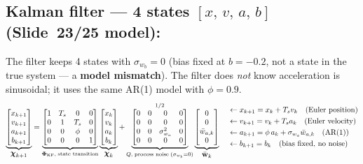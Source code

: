 \documentclass[12pt, a4paper]{article}
\begin{document}
\subsection*{Kalman filter --- 4 states $[x,\,v,\,a,\,b]$ (Slide~23/25 model):}
\vspace{-0.2cm}
The filter keeps 4 states with $\sigma_{w_b} = 0$ (bias fixed at $b = -0.2$, not a state in the true system --- a \textbf{model mismatch}).
The filter does \emph{not} know acceleration is sinusoidal; it uses the same AR(1) model with $\phi = 0.9$.
\vspace{-0.2cm}
\[
\underbrace{
\begin{bmatrix} x_{k+1} \\ v_{k+1} \\ a_{k+1} \\ b_{k+1} \end{bmatrix}
}_{\displaystyle\boldsymbol{\chi}_{k+1}}
=
\underbrace{
\begin{bmatrix}
  1 & T_s & 0    & 0 \\
  0 & 1   & T_s  & 0 \\
  0 & 0   & \phi & 0 \\
  0 & 0   & 0    & 1
\end{bmatrix}
}_{\boldsymbol{\Phi}_{\text{KF}},\;{\scriptsize\text{state transition}}}
\underbrace{
\begin{bmatrix} x_k \\ v_k \\ a_k \\ b_k \end{bmatrix}
}_{\displaystyle\boldsymbol{\chi}_k}
+
\underbrace{
\begin{bmatrix}
  0 & 0 & 0              & 0 \\
  0 & 0 & 0              & 0 \\
  0 & 0 & \sigma_{w_a}^2 & 0 \\
  0 & 0 & 0              & 0
\end{bmatrix}
}_{Q,\;{\scriptsize\text{process noise}}\;(\sigma_{w_b}=0)}^{1/2}
\underbrace{
\begin{bmatrix} 0 \\ 0 \\ \bar{w}_{a,k} \\ 0 \end{bmatrix}
}_{\displaystyle\bar{\mathbf{w}}_k}
\quad
\begin{aligned}
  &\leftarrow x_{k+1} = x_k + T_s v_k \quad \text{(Euler position)}\\
  &\leftarrow v_{k+1} = v_k + T_s a_k \quad \text{(Euler velocity)}\\
  &\leftarrow a_{k+1} = \phi\,a_k + \sigma_{w_a}\bar{w}_{a,k} \quad \text{(AR(1))}\\
  &\leftarrow b_{k+1} = b_k \quad \text{(bias fixed, no noise)}
\end{aligned}
\]
\vspace{-0.4cm}
\end{document}
